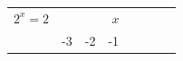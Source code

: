 {{\begin{center}
      \label{m39253*id154574}
      
    \noindent
      \tablelasttail{}
      \begin{xtabular}[t]{|l|l|l|l|l|l|l|l|}\hline
    
    
        
                \begin{math}{2}^{x}=2\end{math}
               &
     \tabularnewline{}
    
    
         &
    
    
        -3 &
    
    
        -2 &
    
    
        -1 &
    

\end{xtabular}
\end{center}}}
